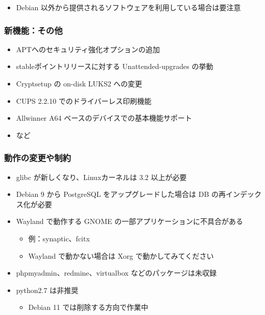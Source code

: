 \documentclass[mingoth,a4paper]{jsarticle}
\begin{document}
\begin{itemize}
\item Debian 以外から提供されるソフトウェアを利用している場合は要注意
\end{itemize}




\subsubsection{新機能：その他}%

\begin{itemize}
\item APTへのセキュリティ強化オプションの追加
\item stableポイントリリースに対する Unattended-upgrades の挙動
\item Cryptsetup の on-disk LUKS2 への変更
\item CUPS 2.2.10 でのドライバーレス印刷機能
\item Allwinner A64 ベースのデバイスでの基本機能サポート
\item など
\end{itemize}




\subsubsection{動作の変更や制約}%

\begin{itemize}
\item glibc が新しくなり、Linuxカーネルは 3.2 以上が必要
\item Debian 9 から PostgreSQL をアップグレードした場合は DB の再インデックス化が必要
\item Wayland で動作する GNOME の一部アプリケーションに不具合がある
  \begin{itemize}
  \item 例：synaptic、fcitx
  \item Wayland で動かない場合は Xorg で動かしてみてください
  \end{itemize}
\item phpmyadmin、redmine、virtualbox などのパッケージは未収録
\item python2.7 は非推奨
  \begin{itemize}
  \item Debian 11 では削除する方向で作業中
  \end{itemize}
\end{itemize}
\end{document}
